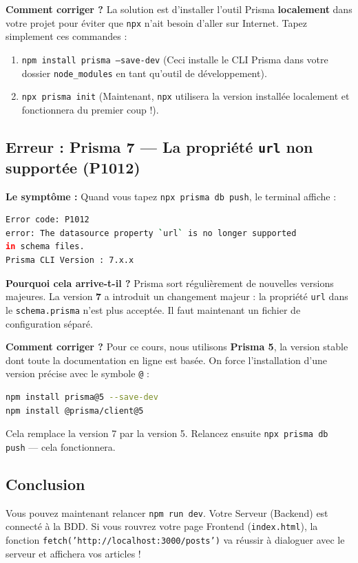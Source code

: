 \textbf{Comment corriger ?}
La solution est d'installer l'outil Prisma \textbf{localement} dans votre projet pour éviter que \texttt{npx} n'ait besoin d'aller sur Internet. Tapez simplement ces commandes :
\begin{enumerate}
    \item \texttt{npm install prisma --save-dev} (Ceci installe le CLI Prisma dans votre dossier \texttt{node\_modules} en tant qu'outil de développement).
    \item \texttt{npx prisma init} (Maintenant, \texttt{npx} utilisera la version installée localement et fonctionnera du premier coup !).
\end{enumerate}

\subsection{Erreur : Prisma 7 --- La propriété \texttt{url} non supportée (P1012)}
\textbf{Le symptôme :} Quand vous tapez \texttt{npx prisma db push}, le terminal affiche :
\begin{lstlisting}[language=bash]
Error code: P1012
error: The datasource property `url` is no longer supported
in schema files.
Prisma CLI Version : 7.x.x
\end{lstlisting}

\textbf{Pourquoi cela arrive-t-il ?}
Prisma sort régulièrement de nouvelles versions majeures. La version \textbf{7} a introduit un changement majeur : la propriété \texttt{url} dans le \texttt{schema.prisma} n'est plus acceptée. Il faut maintenant un fichier de configuration séparé.

\textbf{Comment corriger ?}
Pour ce cours, nous utilisons \textbf{Prisma 5}, la version stable dont toute la documentation en ligne est basée. On force l'installation d'une version précise avec le symbole \texttt{@} :
\begin{lstlisting}[language=bash]
npm install prisma@5 --save-dev
npm install @prisma/client@5
\end{lstlisting}
Cela remplace la version 7 par la version 5. Relancez ensuite \texttt{npx prisma db push} — cela fonctionnera.

\subsection{Conclusion}
Vous pouvez maintenant relancer \texttt{npm run dev}. Votre Serveur (Backend) est connecté à la BDD. Si vous rouvrez votre page Frontend (\texttt{index.html}), la fonction \texttt{fetch('http://localhost:3000/posts')} va réussir à dialoguer avec le serveur et affichera vos articles !

